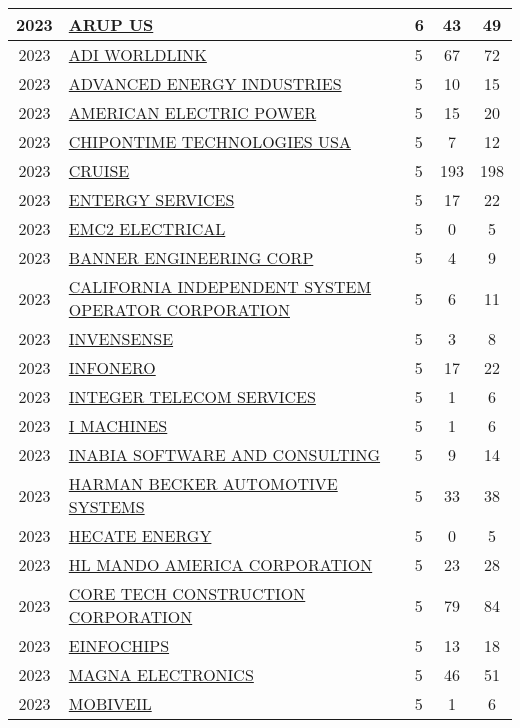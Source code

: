 \documentclass{article}%
\begin{document}
\begin{longtable}{c|p{20em}|p{5em}|c|c}
\hline%
2023&\hyperref[subsec:ARUPUS]{ARUP US}&6&43&49\\%
\hline%
2023&\hyperref[subsec:ADIWORLDLINK]{ADI WORLDLINK}&5&67&72\\%
\hline%
2023&\hyperref[subsec:ADVANCEDENERGYINDUSTRIES]{ADVANCED ENERGY INDUSTRIES}&5&10&15\\%
\hline%
2023&\hyperref[subsec:AMERICANELECTRICPOWER]{AMERICAN ELECTRIC POWER}&5&15&20\\%
\hline%
2023&\hyperref[subsec:CHIPONTIMETECHNOLOGIESUSA]{CHIPONTIME TECHNOLOGIES USA}&5&7&12\\%
\hline%
2023&\hyperref[subsec:CRUISE]{CRUISE}&5&193&198\\%
\hline%
2023&\hyperref[subsec:ENTERGYSERVICES]{ENTERGY SERVICES}&5&17&22\\%
\hline%
2023&\hyperref[subsec:EMC2ELECTRICAL]{EMC2 ELECTRICAL}&5&0&5\\%
\hline%
2023&\hyperref[subsec:BANNERENGINEERINGCORP]{BANNER ENGINEERING CORP}&5&4&9\\%
\hline%
2023&\hyperref[subsec:CALIFORNIAINDEPENDENTSYSTEMOPERATORCORPORATION]{CALIFORNIA INDEPENDENT SYSTEM OPERATOR CORPORATION}&5&6&11\\%
\hline%
2023&\hyperref[subsec:INVENSENSE]{INVENSENSE}&5&3&8\\%
\hline%
2023&\hyperref[subsec:INFONERO]{INFONERO}&5&17&22\\%
\hline%
2023&\hyperref[subsec:INTEGERTELECOMSERVICES]{INTEGER TELECOM SERVICES}&5&1&6\\%
\hline%
2023&\hyperref[subsec:IMACHINES]{I MACHINES}&5&1&6\\%
\hline%
2023&\hyperref[subsec:INABIASOFTWAREANDCONSULTING]{INABIA SOFTWARE AND CONSULTING}&5&9&14\\%
\hline%
2023&\hyperref[subsec:HARMANBECKERAUTOMOTIVESYSTEMS]{HARMAN BECKER AUTOMOTIVE SYSTEMS}&5&33&38\\%
\hline%
2023&\hyperref[subsec:HECATEENERGY]{HECATE ENERGY}&5&0&5\\%
\hline%
2023&\hyperref[subsec:HLMANDOAMERICACORPORATION]{HL MANDO AMERICA CORPORATION}&5&23&28\\%
\hline%
2023&\hyperref[subsec:CORETECHCONSTRUCTIONCORPORATION]{CORE TECH CONSTRUCTION CORPORATION}&5&79&84\\%
\hline%
2023&\hyperref[subsec:EINFOCHIPS]{EINFOCHIPS}&5&13&18\\%
\hline%
2023&\hyperref[subsec:MAGNAELECTRONICS]{MAGNA ELECTRONICS}&5&46&51\\%
\hline%
2023&\hyperref[subsec:MOBIVEIL]{MOBIVEIL}&5&1&6\\%

\end{longtable}
\end{document}
